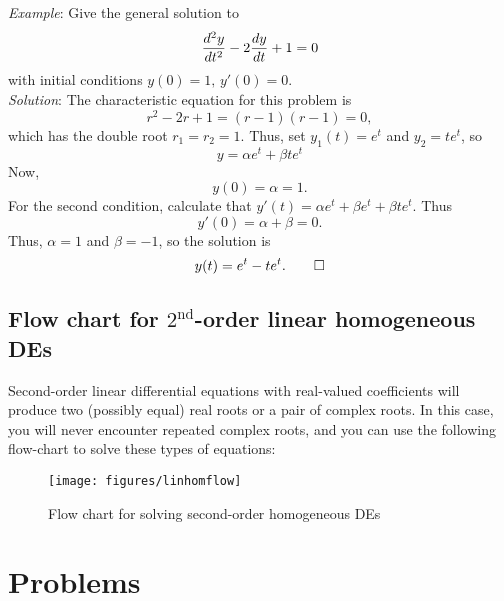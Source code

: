 \documentclass[12pt]{book}
\begin{document}
\noindent\emph{Example}: Give the general solution to
\begin{dmath*}
  \ddtwo{y}{t} - 2 \dd{y}{t}+1 =0
\end{dmath*}
with initial conditions $y(0) =1, \, y'(0) =0.$\\
\noindent\emph{Solution}:
The characteristic equation for this problem is
\begin{dmath*}
  r^2 - 2r +1 = (r-1)(r-1) =0,
\end{dmath*}
which has the double root $r_1=r_2=1$. Thus, set
$y_1(t) = e^t$ and $y_2=t e^t$, so
\begin{dmath*}
  y = \alpha e^t + \beta t e^t
\end{dmath*}
Now,
\begin{dmath*}[compact]
  y(0) = \alpha = 1.
\end{dmath*}
For the second condition, calculate that
$y'(t) = \alpha e^t + \beta e^t + \beta te^t$. Thus
\begin{dmath*}[compact]
  y'(0) = \alpha + \beta =0.
\end{dmath*}
Thus, $\alpha=1$ and $\beta =-1$, so the solution is
\begin{dmath*}[compact]
  y(t) = e^t - te^t. \qed
\end{dmath*}

\newpage
\subsection{Flow chart for $2^{\text{nd}}$-order linear homogeneous DEs}

Second-order linear differential equations with real-valued
coefficients will produce two (possibly equal) real roots or a pair of
complex roots.  In this case, you will never encounter repeated
complex roots, and you can use the following flow-chart to solve these
types of equations:

\vspace{0.5in}
\begin{figure}[h]
  \centering
  \texttt{[image: figures/linhomflow]}
  \caption{Flow chart for solving second-order homogeneous DEs}
  \label{fig:linhomflow}
\end{figure}



\section{Problems}
\end{document}

